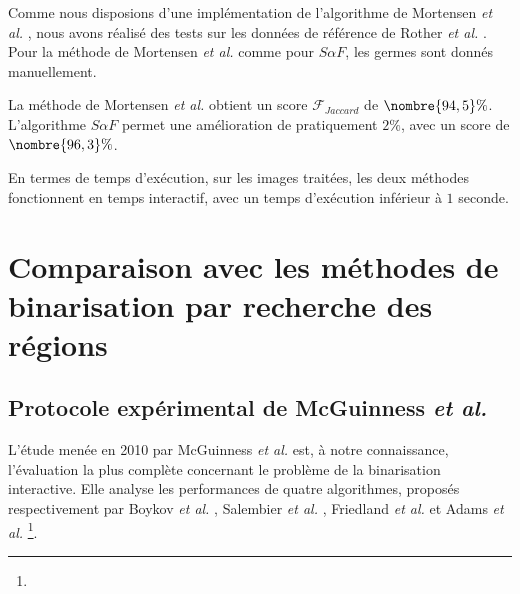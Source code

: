 Comme nous disposions d'une implémentation de l'algorithme de Mortensen \textit{et al.} , nous avons réalisé des tests sur les données de référence de Rother \textit{et al.} \cite{rother2004grabcut}.   Pour la méthode de Mortensen \textit{et al.}\modif{,} comme pour $S \alpha F$, les germes sont donnés manuellement. 

La méthode de Mortensen \textit{et al.}  obtient un score $\mathcal{F}_{Jaccard}$ de $\nombre{94,5}\%$. L'algorithme $S \alpha F$ permet une amélioration de pratiquement $2 \%$, avec un score de $\nombre{96,3}\%$.

En termes de temps d’exécution, sur les images traitées, les deux méthodes fonctionnent en temps interactif, avec un temps d'exécution inférieur à $1$ seconde. 


\section{Comparaison avec les méthodes de binarisation  par recherche des régions }

\subsection{Protocole expérimental de McGuinness \textit{et al.}}
L'étude menée en 2010 par McGuinness \textit{et al.} \cite{mcguinness2010comparative} est, à notre connaissance, l'évaluation la plus complète concernant le problème de la binarisation interactive. Elle analyse les performances de quatre algorithmes, proposés respectivement par Boykov \textit{et al.}  \cite{boykov2001interactive},  Salembier \textit{et al.} \cite{salembier2000binary},  Friedland \textit{et al.} \cite{friedland2005siox} et Adams \textit{et al.} \cite{adams1994seeded}\footnote{}. 


